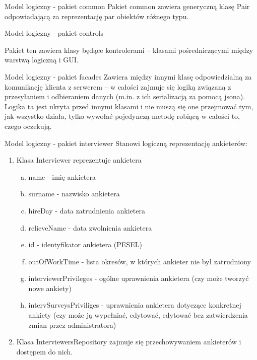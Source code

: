 \documentclass[a4paper,10pt]{beamer}
\begin{document}
	\begin{frame}{Model logiczny - pakiet common}
		Pakiet common zawiera generyczną klasę Pair odpowiadającą za reprezentację par obiektów różnego typu.
	\end{frame}
	\begin{frame}{Model logiczny - pakiet controls}
		
		Pakiet ten zawiera klasy będące kontrolerami – klasami pośredniczącymi między warstwą logiczną i GUI.
	\end{frame}
	\begin{frame}{Model logiczny - pakiet facades}	
		Zawiera między innymi klasę odpowiedzialną za komunikację klienta z serwerem – w całości zajmuje się logiką związaną z przesyłaniem i odbieraniem danych (m.in. z ich serializacją za pomocą jsona). Logika ta jest ukryta przed innymi klasami i nie muszą się one przejmować tym, jak wszystko działa, tylko wywołać pojedynczą metodę robiącą w całości to, czego oczekują.
	\end{frame}
	\begin{frame}{Model logiczny - pakiet interviewer}
		Stanowi logiczną reprezentację ankieterów:
		\begin{enumerate}[1)]
				\item Klasa Interviewer reprezentuje ankietera
				\begin{enumerate}[a)]
						\item name - imię ankietera
						\item surname - nazwisko ankietera
						\item hireDay - data zatrudnienia ankietera
						\item relieveName - data zwolnienia ankietera
						\item id - identyfikator ankietera (PESEL)
						\item outOfWorkTime - lista okresów, w których ankieter nie był zatrudniony
						\item interviewerPrivileges - ogólne uprawnienia ankietera (czy może tworzyć nowe ankiety)
						\item intervSurveysPriviliges - uprawnienia ankietera dotyczące konkretnej ankiety (czy może ją wypełniać, edytować, edytować bez zatwierdzenia zmian przez administratora)
				\end{enumerate}
				\item Klasa InterviewersRepository zajmuje się przechowywaniem ankieterów i dostępem do nich.	
		\end{enumerate}
	\end{frame}
\end{document}
